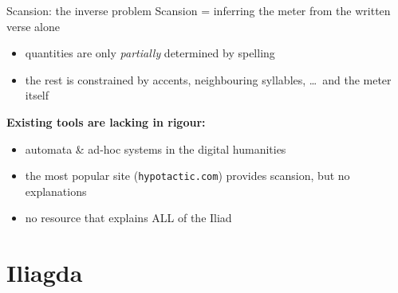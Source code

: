 \documentclass[aspectratio=169]{beamer}
\begin{document}
\begin{frame}{Scansion: the inverse problem}
\alert{Scansion} = inferring the meter from the written verse alone
\begin{itemize}
\item quantities are only \emph{partially} determined by spelling
\item the rest is constrained by accents, neighbouring syllables, \ldots\
      and \alert{the meter itself}
\end{itemize}
\vfill
\pause
\textbf{Existing tools are lacking in rigour:}
\begin{itemize}
\item automata \& ad-hoc systems in the digital humanities
\item the most popular site (\texttt{hypotactic.com}) provides scansion,
      but \alert{no explanations}
\item \alert{no resource that explains ALL of the Iliad}
\end{itemize}
\end{frame}


\section{Iliagda}
\end{document}

